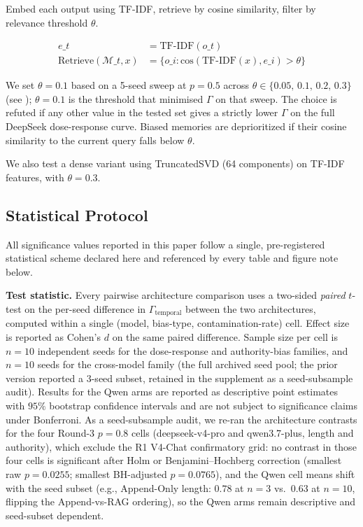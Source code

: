 \documentclass[11pt]{article}
\begin{document}
Embed each output using TF-IDF, retrieve by cosine similarity, filter by relevance threshold $\theta$.

\begin{align}
e\_t &= \text{TF-IDF}(o\_t) \\
\text{Retrieve}(\mathcal{M}\_t, x) &= \{o\_i : \text{cos}(\text{TF-IDF}(x), e\_i) > \theta\}
\end{align}

We set $\theta = 0.1$ based on a 5-seed sweep at $p=0.5$ across $\theta \in \{0.05,\,0.1,\,0.2,\,0.3\}$ (see ); $\theta = 0.1$ is the threshold that minimised $\Gamma$ on that sweep. The choice is refuted if any other value in the tested set gives a strictly lower $\Gamma$ on the full DeepSeek dose-response curve. Biased memories are deprioritized if their cosine similarity to the current query falls below $\theta$.

We also test a dense variant using TruncatedSVD (64 components) on TF-IDF features, with $\theta = 0.3$.


\subsection{Statistical Protocol}
\label{sec:stat-protocol}

All significance values reported in this paper follow a single, pre-registered statistical scheme declared here and referenced by every table and figure note below.

\textbf{Test statistic.} Every pairwise architecture comparison uses a two-sided \emph{paired} $t$-test on the per-seed difference in $\Gamma_{\text{temporal}}$ between the two architectures, computed within a single (model, bias-type, contamination-rate) cell. Effect size is reported as Cohen's $d$ on the same paired difference. Sample size per cell is $n=10$ independent seeds for the dose-response and authority-bias families, and $n=10$ seeds for the cross-model family (the full archived seed pool; the prior version reported a $3$-seed subset, retained in the supplement as a seed-subsample audit). Results for the Qwen arms are reported as descriptive point estimates with $95\%$ bootstrap confidence intervals and are not subject to significance claims under Bonferroni. As a seed-subsample audit, we re-ran the architecture contrasts for the four Round-3 $p{=}0.8$ cells (deepseek-v4-pro and qwen3.7-plus, length and authority), which exclude the R1 V4-Chat confirmatory grid: no contrast in those four cells is significant after Holm or Benjamini--Hochberg correction (smallest raw $p = 0.0255$; smallest BH-adjusted $p = 0.0765$), and the Qwen cell means shift with the seed subset (e.g., Append-Only length: $0.78$ at $n{=}3$ vs.\ $0.63$ at $n{=}10$, flipping the Append-vs-RAG ordering), so the Qwen arms remain descriptive and seed-subset dependent.
\end{document}
